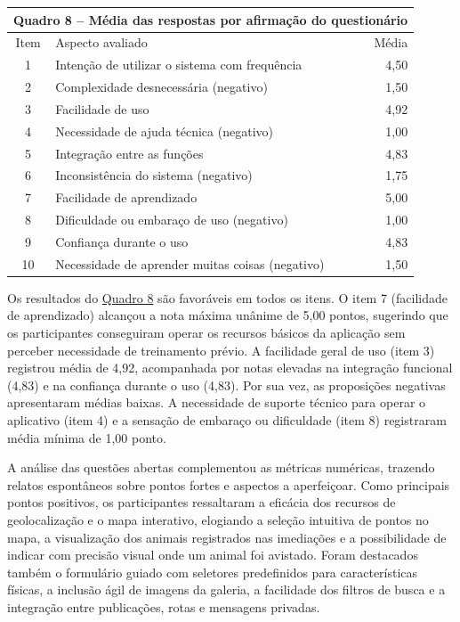 \begin{table}[H]
    \centering
    \hypertarget{quadro:medias_itens_sus}{}\label{quadro:medias_itens_sus}
    \small
    \renewcommand{\arraystretch}{1.15}
    \begin{tabular}{|c|p{9.0cm}|r|}
        \hline
        \multicolumn{3}{|c|}{Quadro 8 -- Média das respostas por afirmação do questionário} \\ \hline
        Item & Aspecto avaliado & Média \\ \hline
        1 & Intenção de utilizar o sistema com frequência & 4,50 \\ \hline
        2 & Complexidade desnecessária (negativo) & 1,50 \\ \hline
        3 & Facilidade de uso & 4,92 \\ \hline
        4 & Necessidade de ajuda técnica (negativo) & 1,00 \\ \hline
        5 & Integração entre as funções & 4,83 \\ \hline
        6 & Inconsistência do sistema (negativo) & 1,75 \\ \hline
        7 & Facilidade de aprendizado & 5,00 \\ \hline
        8 & Dificuldade ou embaraço de uso (negativo) & 1,00 \\ \hline
        9 & Confiança durante o uso & 4,83 \\ \hline
        10 & Necessidade de aprender muitas coisas (negativo) & 1,50 \\ \hline
    \end{tabular}
\end{table}

Os resultados do \hyperref[quadro:medias_itens_sus]{Quadro 8} são favoráveis em todos os itens. O item 7 (facilidade de aprendizado) alcançou a nota máxima unânime de 5,00 pontos, sugerindo que os participantes conseguiram operar os recursos básicos da aplicação sem perceber necessidade de treinamento prévio. A facilidade geral de uso (item 3) registrou média de 4,92, acompanhada por notas elevadas na integração funcional (4,83) e na confiança durante o uso (4,83). Por sua vez, as proposições negativas apresentaram médias baixas. A necessidade de suporte técnico para operar o aplicativo (item 4) e a sensação de embaraço ou dificuldade (item 8) registraram média mínima de 1,00 ponto.

A análise das questões abertas complementou as métricas numéricas, trazendo relatos espontâneos sobre pontos fortes e aspectos a aperfeiçoar. Como principais pontos positivos, os participantes ressaltaram a eficácia dos recursos de geolocalização e o mapa interativo, elogiando a seleção intuitiva de pontos no mapa, a visualização dos animais registrados nas imediações e a possibilidade de indicar com precisão visual onde um animal foi avistado. Foram destacados também o formulário guiado com seletores predefinidos para características físicas, a inclusão ágil de imagens da galeria, a facilidade dos filtros de busca e a integração entre publicações, rotas e mensagens privadas.

